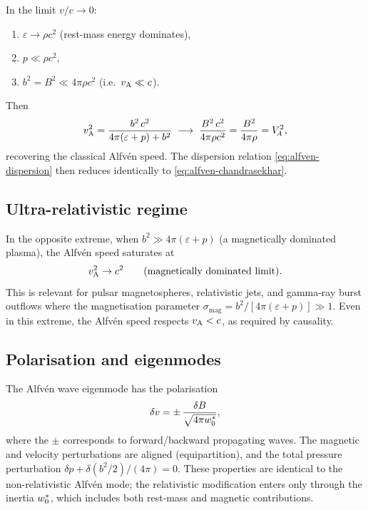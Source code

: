 In the limit $v/c\to 0$:
\begin{enumerate}
  \item $\varepsilon \to \rho c^{2}$ (rest-mass energy dominates),
  \item $p \ll \rho c^{2}$,
  \item $b^{2} = B^{2} \ll 4\pi\rho c^{2}$ (i.e.\ $v_{\mathrm{A}} \ll c$).
\end{enumerate}
Then
\begin{equation}
  v_{\mathrm{A}}^{2}
  = \frac{b^{2}\,c^{2}}{4\pi(\varepsilon+p)+b^{2}}
  \;\longrightarrow\;
  \frac{B^{2}\,c^{2}}{4\pi\rho c^{2}}
  = \frac{B^{2}}{4\pi\rho}
  = V_{\!A}^{2},
  \label{eq:vA-NR-limit}
\end{equation}
recovering the classical Alfv\'en speed.  The dispersion relation
\eqref{eq:alfven-dispersion} then reduces identically to
\eqref{eq:alfven-chandrasekhar}.

\subsection{Ultra-relativistic regime}

In the opposite extreme, when $b^{2}\gg 4\pi(\varepsilon+p)$ (a
magnetically dominated plasma), the Alfv\'en speed saturates at
\begin{equation}
  v_{\mathrm{A}}^{2} \to c^{2}
  \qquad\text{(magnetically dominated limit)}.
  \label{eq:vA-ultra}
\end{equation}
This is relevant for pulsar magnetospheres, relativistic jets, and
gamma-ray burst outflows where the magnetisation parameter
$\sigma_{\mathrm{mag}} = b^{2}/[4\pi(\varepsilon+p)] \gg 1$.  Even in
this extreme, the Alfv\'en speed respects $v_{\mathrm{A}} < c$, as required by
causality.

\subsection{Polarisation and eigenmodes}

The Alfv\'en wave eigenmode has the polarisation
\begin{equation}
  \delta v = \pm\,\frac{\delta B}{\sqrt{4\pi w^{\ast}_{0}}},
  \label{eq:alfven-eigenmode}
\end{equation}
where the $\pm$ corresponds to forward/backward propagating waves.
The magnetic and velocity perturbations are aligned (equipartition), and
the total pressure perturbation $\delta p + \delta(b^{2}/2)/(4\pi) = 0$.
These properties are identical to the non-relativistic Alfv\'en mode; the
relativistic modification enters only through the inertia
$w^{\ast}_{0}$, which includes both rest-mass and magnetic
contributions.


